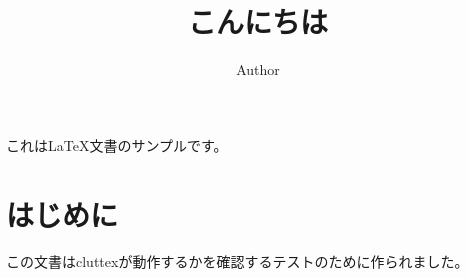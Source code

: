 \documentclass{ltjsarticle}
\title{こんにちは}
\author{Author}
\begin{document}
\maketitle

これは\LaTeX 文書のサンプルです。

\clearpage

\section{はじめに}

この文書はcluttexが動作するかを確認するテストのために作られました。
\end{document}
